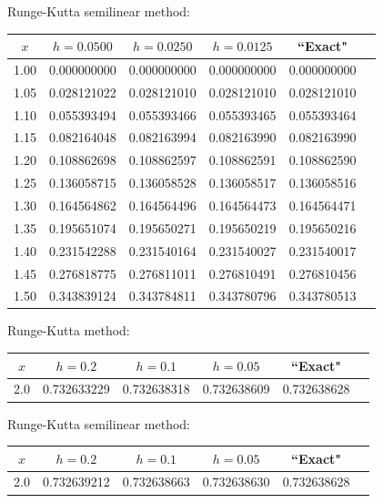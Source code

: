 \hspace{.75in}
{\small Runge-Kutta semilinear method:
\begin{tabular}{|c|r|r|r|r|r|}
\hline
\multicolumn{1}{|c|}{$x$}&
\multicolumn{1}{|c|}{$h=0.0500$}&
\multicolumn{1}{|c|}{$h=0.0250$}&
\multicolumn{1}{|c|}{$h=0.0125$}&
\multicolumn{1}{|c|}{``Exact"}\\ \hline
1.00 & 0.000000000 & 0.000000000 & 0.000000000 & 0.000000000 \\
1.05 & 0.028121022 & 0.028121010 & 0.028121010 & 0.028121010 \\
1.10 & 0.055393494 & 0.055393466 & 0.055393465 & 0.055393464 \\
1.15 & 0.082164048 & 0.082163994 & 0.082163990 & 0.082163990 \\
1.20 & 0.108862698 & 0.108862597 & 0.108862591 & 0.108862590 \\
1.25 & 0.136058715 & 0.136058528 & 0.136058517 & 0.136058516 \\
1.30 & 0.164564862 & 0.164564496 & 0.164564473 & 0.164564471 \\
1.35 & 0.195651074 & 0.195650271 & 0.195650219 & 0.195650216 \\
1.40 & 0.231542288 & 0.231540164 & 0.231540027 & 0.231540017 \\
1.45 & 0.276818775 & 0.276811011 & 0.276810491 & 0.276810456 \\
1.50 & 0.343839124 & 0.343784811 & 0.343780796 & 0.343780513 \\
\hline
\end{tabular}}\bigskip

{\small Runge-Kutta method:
\begin{tabular}{|c|r|r|r|r|r|}
\hline
\multicolumn{1}{|c|}{$x$}&
\multicolumn{1}{|c|}{$h=0.2$}&
\multicolumn{1}{|c|}{$h=0.1$}&
\multicolumn{1}{|c|}{$h=0.05$}&
\multicolumn{1}{|c|}{``Exact"}\\ \hline
2.0 & 0.732633229 & 0.732638318 & 0.732638609 & 0.732638628 \\
\hline
\end{tabular}}\bigskip


\hspace{.75in}
{\small Runge-Kutta semilinear method:
\begin{tabular}{|c|r|r|r|r|r|}
\hline
\multicolumn{1}{|c|}{$x$}&
\multicolumn{1}{|c|}{$h=0.2$}&
\multicolumn{1}{|c|}{$h=0.1$}&
\multicolumn{1}{|c|}{$h=0.05$}&
\multicolumn{1}{|c|}{``Exact"}\\ \hline
2.0 & 0.732639212 & 0.732638663 & 0.732638630 & 0.732638628 \\
\hline
\end{tabular}}\bigskip

